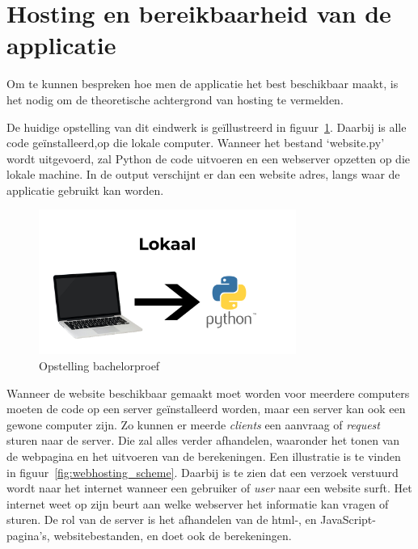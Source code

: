\section{Hosting en bereikbaarheid van de applicatie}
Om te kunnen bespreken hoe men de applicatie het best beschikbaar maakt, is het nodig om de theoretische achtergrond van hosting te vermelden.

De huidige opstelling van dit eindwerk is geïllustreerd in figuur~\ref{fig:opstelling_bachelorproef}. Daarbij is alle code geïnstalleerd,op die lokale computer. Wanneer het bestand `website.py' wordt uitgevoerd, zal Python de code uitvoeren en een webserver opzetten op die lokale machine. In de output verschijnt er dan een website adres, langs waar de applicatie gebruikt kan worden.

\begin{figure}
    \centering
    \includegraphics[width=0.75\textwidth]{./img/lokaal_website}
    \caption{\label{fig:opstelling_bachelorproef} Opstelling bachelorproef}
\end{figure}

Wanneer de website beschikbaar gemaakt moet worden voor meerdere computers moeten de code op een server geïnstalleerd worden, maar een server kan ook een gewone computer zijn. Zo kunnen er meerde \textit{clients} een aanvraag of \textit{request} sturen naar de server. Die zal alles verder afhandelen, waaronder het tonen van de webpagina en het uitvoeren van de berekeningen. Een illustratie is te vinden in figuur~\ref{fig:webhosting_scheme}. Daarbij is te zien dat een verzoek verstuurd wordt naar het internet wanneer een gebruiker of \textit{user} naar een website surft. Het internet weet op zijn beurt aan welke webserver het informatie kan vragen of sturen.
De rol van de server is het afhandelen van de html-, en JavaScript-pagina's, websitebestanden, en doet ook de berekeningen.

